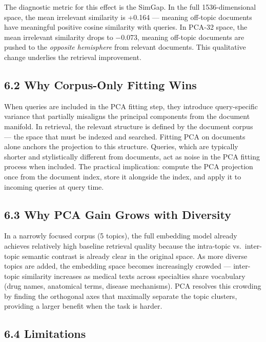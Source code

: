 \documentclass[
  11pt,
  letterpaper,
]{article}
\begin{document}
The diagnostic metric for this effect is the SimGap. In the full
1536-dimensional space, the mean irrelevant similarity is +0.164 ---
meaning off-topic documents have meaningful positive cosine similarity
with queries. In PCA-32 space, the mean irrelevant similarity drops to
−0.073, meaning off-topic documents are pushed to the \emph{opposite
hemisphere} from relevant documents. This qualitative change underlies
the retrieval improvement.

\subsection{6.2 Why Corpus-Only Fitting
Wins}\label{why-corpus-only-fitting-wins}

When queries are included in the PCA fitting step, they introduce
query-specific variance that partially misaligns the principal
components from the document manifold. In retrieval, the relevant
structure is defined by the document corpus --- the space that must be
indexed and searched. Fitting PCA on documents alone anchors the
projection to this structure. Queries, which are typically shorter and
stylistically different from documents, act as noise in the PCA fitting
process when included. The practical implication: compute the PCA
projection once from the document index, store it alongside the index,
and apply it to incoming queries at query time.

\subsection{6.3 Why PCA Gain Grows with
Diversity}\label{why-pca-gain-grows-with-diversity}

In a narrowly focused corpus (5 topics), the full embedding model
already achieves relatively high baseline retrieval quality because the
intra-topic vs.~inter-topic semantic contrast is already clear in the
original space. As more diverse topics are added, the embedding space
becomes increasingly crowded --- inter-topic similarity increases as
medical texts across specialties share vocabulary (drug names,
anatomical terms, disease mechanisms). PCA resolves this crowding by
finding the orthogonal axes that maximally separate the topic clusters,
providing a larger benefit when the task is harder.

\subsection{6.4 Limitations}\label{limitations}
\end{document}
